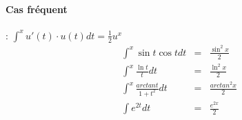 				\paragraph{Cas fréquent} : $ \int^x u'(t)\cdot u(t) dt = \frac{1}{2}u^{x}$
				\[\begin{array}{rcl}
						\int^x \sin t \cos t dt &=& \frac{\sin^2 x}{2} \\
						\int^x \frac{\ln t}{t} dt &=& \frac{\ln^2 x}{2} \\
						\int^x \frac{arctan t}{1+t^2} dt &=& \frac{arctan^2 x}{2}\\
						\int e^{2t} dt &=& \frac{e^{2x}}{2}\end{array}\]
